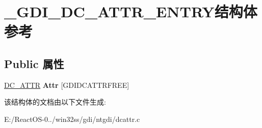 \hypertarget{struct___g_d_i___d_c___a_t_t_r___e_n_t_r_y}{}\section{\+\_\+\+G\+D\+I\+\_\+\+D\+C\+\_\+\+A\+T\+T\+R\+\_\+\+E\+N\+T\+R\+Y结构体 参考}
\label{struct___g_d_i___d_c___a_t_t_r___e_n_t_r_y}
\subsection*{Public 属性}
\begin{DoxyCompactItemize}
\item 
\mbox{\label{struct___g_d_i___d_c___a_t_t_r___e_n_t_r_y_a583e2e3c00717e41999e3b36303ebcc6}} 
\hyperlink{struct___d_c___a_t_t_r}{D\+C\+\_\+\+A\+T\+TR} {\bfseries Attr} \mbox{[}G\+D\+I\+D\+C\+A\+T\+T\+R\+F\+R\+EE\mbox{]}
\end{DoxyCompactItemize}


该结构体的文档由以下文件生成\+:\begin{DoxyCompactItemize}
\item 
E\+:/\+React\+O\+S-\/0../win32ss/gdi/ntgdi/dcattr.\+c\end{DoxyCompactItemize}
